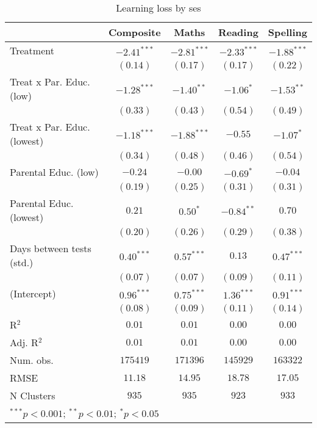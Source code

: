 
\begin{table}
\begin{center}
\begin{tabular}{l c c c c}
\hline
 & Composite & Maths & Reading & Spelling \\
\hline
Treatment                   & $-2.41^{***}$ & $-2.81^{***}$ & $-2.33^{***}$ & $-1.88^{***}$ \\
                            & $(0.14)$      & $(0.17)$      & $(0.17)$      & $(0.22)$      \\
Treat x Par. Educ. (low)    & $-1.28^{***}$ & $-1.40^{**}$  & $-1.06^{*}$   & $-1.53^{**}$  \\
                            & $(0.33)$      & $(0.43)$      & $(0.54)$      & $(0.49)$      \\
Treat x Par. Educ. (lowest) & $-1.18^{***}$ & $-1.88^{***}$ & $-0.55$       & $-1.07^{*}$   \\
                            & $(0.34)$      & $(0.48)$      & $(0.46)$      & $(0.54)$      \\
Parental Educ. (low)        & $-0.24$       & $-0.00$       & $-0.69^{*}$   & $-0.04$       \\
                            & $(0.19)$      & $(0.25)$      & $(0.31)$      & $(0.31)$      \\
Parental Educ. (lowest)     & $0.21$        & $0.50^{*}$    & $-0.84^{**}$  & $0.70$        \\
                            & $(0.20)$      & $(0.26)$      & $(0.29)$      & $(0.38)$      \\
Days between tests (std.)   & $0.40^{***}$  & $0.57^{***}$  & $0.13$        & $0.47^{***}$  \\
                            & $(0.07)$      & $(0.07)$      & $(0.09)$      & $(0.11)$      \\
(Intercept)                 & $0.96^{***}$  & $0.75^{***}$  & $1.36^{***}$  & $0.91^{***}$  \\
                            & $(0.08)$      & $(0.09)$      & $(0.11)$      & $(0.14)$      \\
\hline
R$^2$                       & $0.01$        & $0.01$        & $0.00$        & $0.00$        \\
Adj. R$^2$                  & $0.01$        & $0.01$        & $0.00$        & $0.00$        \\
Num. obs.                   & $175419$      & $171396$      & $145929$      & $163322$      \\
RMSE                        & $11.18$       & $14.95$       & $18.78$       & $17.05$       \\
N Clusters                  & $935$         & $935$         & $923$         & $933$         \\
\hline
\multicolumn{5}{l}{\scriptsize{$^{***}p<0.001$; $^{**}p<0.01$; $^{*}p<0.05$}}
\end{tabular}
\caption{Learning loss by ses}
\label{tableses}
\end{center}
\end{table}
